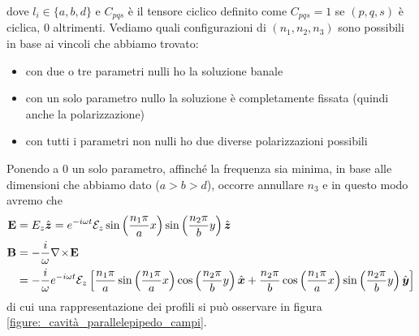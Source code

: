 dove $ l_i \in \{ a, b, d\} $ e $ C_{pqs} $ è il tensore ciclico definito come $ C_{pqs} = 1 $ se $ (p,q,s) $ è ciclica, $ 0 $ altrimenti. Vediamo quali 
configurazioni di $ (n_1,n_2,n_3) $ sono possibili in base ai vincoli che abbiamo trovato:
\begin{itemize}
  \item con due o tre parametri nulli ho la soluzione banale
  \item con un solo parametro nullo la soluzione è completamente fissata (quindi anche la polarizzazione)
  \item con tutti i parametri non nulli ho due diverse polarizzazioni possibili
\end{itemize}
Ponendo a $ 0 $ un solo parametro, affinché la frequenza sia minima, in base alle dimensioni che abbiamo dato ($ a>b>d $), occorre annullare $ n_3 $ e in 
questo modo avremo che
\begin{align}
  \mathbf{ E } &= E_z \hat{\boldsymbol{z}} = e^{-i\omega t} \mathcal{E}_z \sin\left( \frac{n_1 \pi}{a} x \right) \sin\left( \frac{n_2 \pi}{b}y \right) \hat{\boldsymbol{z}}
  \\
  \mathbf{ B } &= -\frac{i}{\omega} \nabla\!\times\!\mathbf{ E } 
  \\
  &= - \frac{i}{\omega} e^{-i\omega t} \mathcal{E}_z \left[ \frac{n_1 \pi}{a} \sin\left( \frac{n_1 \pi}{a}x 
  \right) \cos\left( \frac{n_2 \pi}{b}y \right)\hat{\boldsymbol{x}} + \frac{n_2 \pi}{b} \cos\left( \frac{n_1 \pi}{a}x 
  \right) \sin\left( \frac{n_2 \pi}{b}y \right)\hat{\boldsymbol{y}}\right]
\end{align}
di cui una rappresentazione dei profili si può osservare in figura \ref{figure:_cavità_parallelepipedo_campi}.


